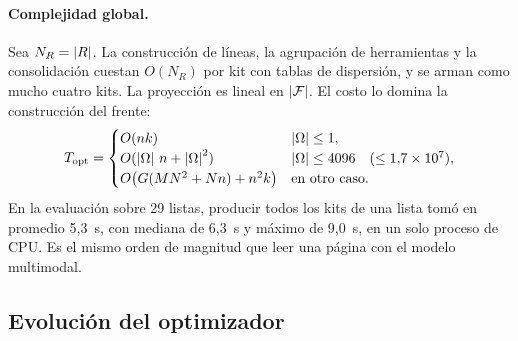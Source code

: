 \paragraph{Complejidad global.} Sea $N_R=\left\lvert R \right\rvert$. La construcción de líneas,
la agrupación de herramientas y la consolidación cuestan $O(N_R)$ por kit con
tablas de dispersión, y se arman como mucho cuatro kits. La proyección es
lineal en $\left\lvert \mathcal{F} \right\rvert$. El costo lo domina la construcción del frente:
\[
  T_{\mathrm{opt}}=\begin{cases}
    O(nk) & \left\lvert \Omega \right\rvert\leq1,\\
    O(\left\lvert \Omega \right\rvert\,n+\left\lvert \Omega \right\rvert^2) & \left\lvert \Omega \right\rvert\leq4096 \quad(\leq 1{,}7\times10^7),\\
    O\bigl(G(MN^2+Nn)+n^2k\bigr) & \text{en otro caso.}
  \end{cases}
\]
En la evaluación sobre 29 listas, producir todos los kits de una lista tomó en
promedio 5,3~s, con mediana de 6,3~s y máximo de 9,0~s, en un solo proceso de
CPU. Es el mismo orden de magnitud que leer una página con el modelo
multimodal.

\subsection{Evolución del optimizador}
\label{sec:opt-evolucion}

